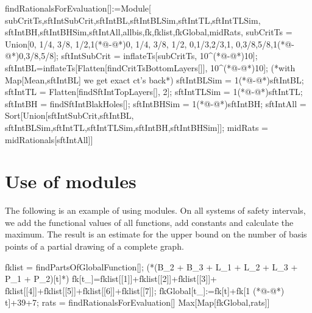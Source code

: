 \begin{code}
findRationalsForEvaluation[]:=Module[
{subCritTs,sftIntSubCrit,sftIntBL,sftIntBLSim,sftIntTL,sftIntTLSim,
sftIntBH,sftIntBHSim,sftIntAll,allbis,fk,fklist,fkGlobal,midRats},
	subCritTs = Union[{0, 1/4, 3/8, 1/2},1(*@-@*){0, 1/4, 3/8, 1/2},
	{0,1/3,2/3,1},
	{0,3/8,5/8},1(*@-@*){0,3/8,5/8}];
	sftIntSubCrit = inflateTs[subCritTs, 10^(*@-@*)10];
	sftIntBL=inflateTs[Flatten[findCritTsBottomLayers[]], 10^(*@-@*)10]; 
	(*with Map[Mean,sftIntBL] we get exact ct's back*)
	sftIntBLSim = 1(*@-@*)sftIntBL;
	sftIntTL = Flatten[findSftIntTopLayers[], 2];
	sftIntTLSim = 1(*@-@*)sftIntTL;
	sftIntBH = findSftIntBlakHoles[];
	sftIntBHSim = 1(*@-@*)sftIntBH;
	sftIntAll = Sort[Union[sftIntSubCrit,sftIntBL,
	sftIntBLSim,sftIntTL,sftIntTLSim,sftIntBH,sftIntBHSim]];
	midRats = midRationals[sftIntAll]]
\end{code}
\vspace{2cm}

\section{Use of modules}
The following is an example of using modules. On all systems of safety intervals, we add the functional values of all functions, add constants and calculate the maximum. The result is an estimate for the upper bound on the number of basis points of a partial drawing of a complete graph.
\begin{code}
fklist = findPartsOfGlobalFunction[];
(*(B_2 + B_3 + L_1 + L_2 + L_3 + P_1 + P_2)[t]*)
fk[t_]=fklist[[1]]+fklist[[2]]+fklist[[3]]+
fklist[[4]]+fklist[[5]]+fklist[[6]]+fklist[[7]];
fkGlobal[t_]:=fk[t]+fk[1 (*@-@*) t]+39+7;
rats = findRationalsForEvaluation[]
Max[Map[fkGlobal,rats]]
\end{code}